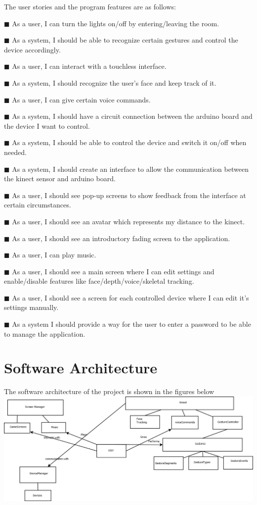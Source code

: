 \begin{itemsize}

The user stories and the program features are as follows:
\box
\item[\tiny{$\blacksquare$}] As a user, I can turn the lights on/off by entering/leaving the room.
\item[\tiny{$\blacksquare$}] As a system, I should be able to recognize certain gestures and control the device accordingly.
\item[\tiny{$\blacksquare$}] As a user, I can interact with a touchless interface.
\item[\tiny{$\blacksquare$}] As a system, I should recognize the user's face and keep track of it.
\item[\tiny{$\blacksquare$}] As a user, I can give certain voice commands.
\item[\tiny{$\blacksquare$}] As a system, I should have a circuit connection between the arduino board and the device I want to control.
\item[\tiny{$\blacksquare$}] As a system, I should be able to control the device and switch it on/off when needed.
\item[\tiny{$\blacksquare$}] As a system, I should create an interface to allow the communication between the kinect sensor and arduino board.
\item[\tiny{$\blacksquare$}] As  a user, I should see pop-up screens to show feedback from the interface at certain circumstances.
\item[\tiny{$\blacksquare$}] As a user, I should see an avatar which represents my distance to the kinect.
\item[\tiny{$\blacksquare$}] As a user, I should see an introductory fading screen to the application.
\item[\tiny{$\blacksquare$}] As a user, I can play music.
\item[\tiny{$\blacksquare$}] As a user, I should see a main screen where I can edit settings and enable/disable features like face/depth/voice/skeletal tracking.
\item[\tiny{$\blacksquare$}] As a user, I should see a screen for each controlled device where I can edit it's settings manually.
\item[\tiny{$\blacksquare$}] As a system I should provide a way for the user to enter a password to be able to manage the application.

\end{itemsize}

\section{Software Architecture}

The software architecture of the project is shown in the figures below
\includegraphics[scale=2]{SoftwareArchitecture.png}
